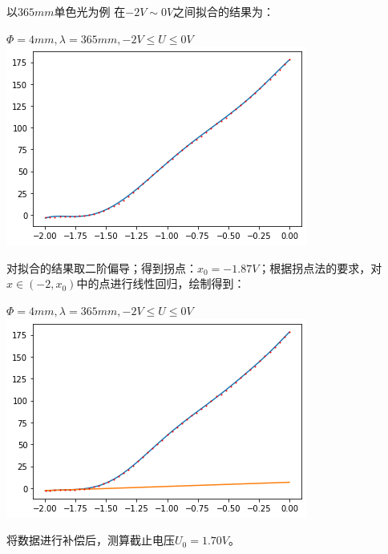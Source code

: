 \documentclass[a4paper]{ltxdoc}
\newenvironment{Figure}
  {\par\medskip\noindent\minipage{\linewidth}}
  {\endminipage\par\medskip}
\begin{document}
\begin{multicols}{2}
\begin{itemize}
              以$365 mm$单色光为例
              在$-2V \sim 0 V$之间拟合的结果为：
              \begin{Figure}
                  \centering
                  $\Phi = 4mm, \lambda = 365mm, -2V\leq U\leq 0V$
                  \includegraphics[width=\linewidth]{img/10.png}
              \end{Figure}

              对拟合的结果取二阶偏导；得到拐点：$x_0=-1.87V$；根据拐点法的要求，对$x \in (-2,x_0)$中的点进行线性回归，绘制得到：
              \begin{Figure}
                  \centering
                  $\Phi = 4mm, \lambda = 365mm, -2V\leq U\leq 0V$
                  \includegraphics[width=\linewidth]{img/11.png}
              \end{Figure}

              将数据进行补偿后，测算截止电压$U_0 = 1.70V$。


\end{itemize}
\end{multicols}
\end{document}
